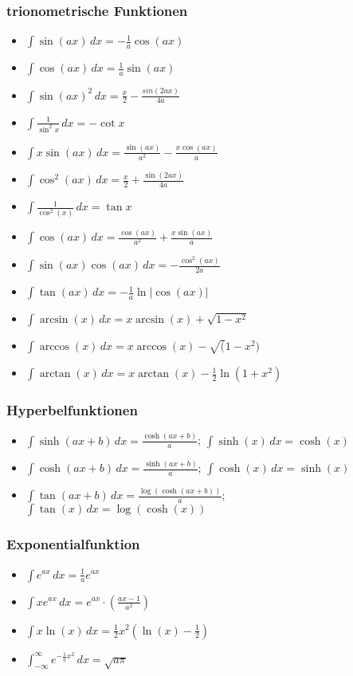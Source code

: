 \subsubsection{trionometrische Funktionen}
\begin{itemize}[leftmargin=*]
	\item $\int \sin(ax) \,dx = -\frac{1}{a}\cos(ax)$
	\item $\int \cos(ax) \,dx = \frac{1}{a}\sin(ax)$
	\item $\int \sin(ax)^2 \,dx = \frac{x}{2} - \frac{sin(2ax)}{4a}$
	\item $\int \frac{1}{\sin^2 x} \,dx = -\cot x$
	\item $\int x \sin(ax) \,dx = \frac{\sin(ax)}{a^2} - \frac{x \cos(ax)}{a}$
	\item $\int \cos^2(ax) \,dx = \frac{x}{2} + \frac{\sin(2ax)}{4a}$
	\item $\int \frac{1}{\cos^2(x)} \,dx = \tan x$
	\item $\int \cos(ax) \,dx = \frac{\cos(ax)}{a^2} + \frac{x \sin(ax)}{a}$
	\item $\int \sin(ax) \cos(ax) \,dx = -\frac{\cos^2(ax)}{2a}$
	\item $\int \tan(ax) \,dx = - \frac{1}{a} \ln | \cos(ax) |$
	\item $\int \arcsin(x) \,dx = x \arcsin(x) + \sqrt{1 - x^2}$
	\item $\int \arccos(x) \,dx = x \arccos(x) - \sqrt(1-x^2)$
	\item $\int \arctan(x) \,dx = x \arctan(x) - \frac{1}{2} \ln(1+x^2)$
\end{itemize}

\subsubsection{Hyperbelfunktionen}
\begin{itemize}[leftmargin=*]
	\item $\int \sinh(ax + b) \,dx = \frac{\cosh(ax + b)}{a}$; $\int \sinh(x) \,dx
	= \cosh(x)$
	\item $\int \cosh(ax + b) \,dx = \frac{\sinh(ax + b)}{a}$; $\int \cosh(x) \,dx
	= \sinh(x)$
	\item $\int \tan(ax + b) \,dx = \frac{\log(\cosh(ax+b))}{a}$; $\int \tan(x)
	\,dx = \log(\cosh(x))$
\end{itemize}

\subsubsection{Exponentialfunktion}
\begin{itemize}[leftmargin=*]
  	\item $\int e^{ax} \,dx = \frac{1}{a} e^{ax}$ 
	\item $\int x e^{ax} \,dx = e^{ax} \cdot \left ( \frac{ax - 1}{a^2} \right )$
	\item $\int x \ln(x) \,dx = \frac{1}{2} x^2 (\ln(x) - \frac{1}{2})$
	\item $\int_{-\infty}^\infty e^{-\frac{1}{a}x^2} \,dx = \sqrt{a \pi}$
\end{itemize}

